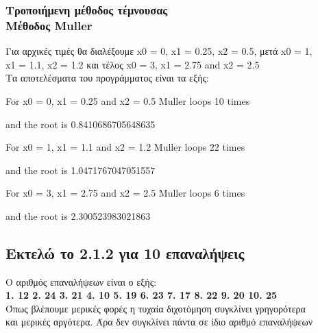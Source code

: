 \documentclass[a4paper,11pt]{article}
\newcommand{\lt}{\latintext}
\newcommand{\gt}{\greektext}
\begin{document}
	\subsubsection{Τροποιήμενη μέθοδος τέμνουσας \\
	 Μέθοδος \lt Muller}
	\normalsize{Για αρχικές τιμές θα διαλέξουμε \lt x0 = 0, 
	x1 = 0.25, x2 = 0.5\gt , μετά \lt x0 = 1, \\ x1 = 1.1, x2 = 1.2 
	\gt  και τέλος \lt x0 = 3, x1 = 2.75 and x2 = 2.5 
\\ \gt Τα αποτελέσματα του προγράμματος είναι τα εξής:\lt 
\par For x0 = 0, x1 = 0.25 and x2 = 0.5 Muller loops 10 times 
\par and the root is 0.8410686705648635
\par For x0 = 1, x1 = 1.1 and x2 = 1.2 Muller loops 22 times 
\par and the root is 1.0471767047051557
\par For x0 = 3, x1 = 2.75 and x2 = 2.5 Muller loops 6 times 
\par and the root is 2.300523983021863}

	\subsection{Εκτελώ το 2.1.2 για 10 επαναλήψεις}
	\normalsize{Ο αριθμός επαναλήψεων είναι ο εξής:\\
\textbf{1. 12 2. 24 3. 21 4. 10 5. 19
6. 23 7. 17 8. 22 9. 20 10. 25}\\
Όπως βλέπουμε μερικές φορές η τυχαία διχοτόμηση συγκλίνει γρηγορότερα 
\\ και μερικές αργότερα. Άρα δεν συγκλίνει πάντα σε ίδιο αριθμό 
επαναλήψεων}
\end{document}
